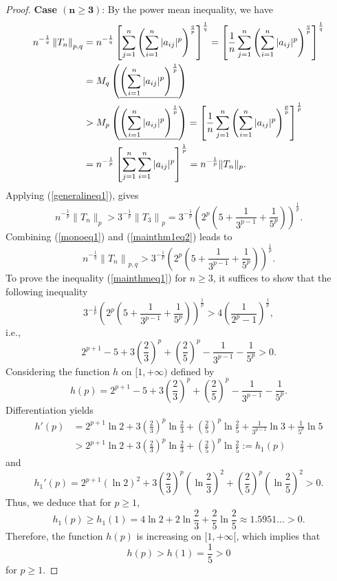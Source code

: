 \documentclass[10pt,a4paper]{amsart}
\begin{document}
\begin{proof} {\bf Case $\boldsymbol{(n\geq3)}$}: By the power mean inequality, we have
\begin{align}\label{monoeq1}
n^{-\frac{1}{q}}\left\|T_{n}\right\|_{p,q}&=n^{-\frac{1}{q}}\left[\sum_{j=1}^n\left(\sum_{i=1}^n|a_{ij}|^p\right)^\frac{q}{p}\right]^\frac{1}{q}=\left[\frac{1}{n}\sum_{j=1}^n\left(\sum_{i=1}^n|a_{ij}|^p\right)^\frac{q}{p}\right]^\frac{1}{q}\notag\\
&=M_q\left(\underline{\left(\sum_{i=1}^n|a_{ij}|^p\right)^\frac{1}{p}}\right)\notag\\
&>M_p\left(\underline{\left(\sum_{i=1}^n|a_{ij}|^p\right)^\frac{1}{p}}\right)=\left[\frac{1}{n}\sum_{j=1}^n\left(\sum_{i=1}^n|a_{ij}|^p\right)^\frac{p}{p}\right]^\frac{1}{p}\notag\\
&=n^{-\frac{1}{p}}\left[\sum_{j=1}^n\sum_{i=1}^n|a_{ij}|^p\right]^\frac{1}{p}=n^{-\frac{1}{p}}\|T_n\|_p.
\end{align}  
Applying  (\ref{generalineq1}), gives
\begin{equation}\label{mainthm1eq2}
n^{-\frac{1}{p}}\|T_n\|_p>3^{-\frac{1}{p}}\left\|T_{3}\right\|_{p}=3^{-\frac{1}{p}}\left(2^{p}\left(5+\frac{1}{3^{p-1}}+\frac{1}{5^{p}}\right)\right)^{\frac{1}{p}}.
\end{equation}
Combining (\ref{monoeq1}) and (\ref{mainthm1eq2}) leads to
$$
n^{-\frac{1}{q}}\left\|T_{n}\right\|_{p,q} >3^{-\frac{1}{p}}\left(2^{p}\left(5+\frac{1}{3^{p-1}}+\frac{1}{5^{p}}\right)\right)^{\frac{1}{p}}.
$$
To prove the inequality (\ref{mainthmeq1}) for $n\geq3$, it suffices to show that the following inequality
$$
3^{-\frac{1}{p}}\left(2^{p}\left(5+\frac{1}{3^{p-1}}+\frac{1}{5^{p}}\right)\right)^{\frac{1}{p}}>4\left(\frac{1}{2^{p}-1}\right)^{\frac{1}{p}},
$$
i.e.,
$$
2^{p+1}-5+3\left(\frac{2}{3}\right)^{p}+\left(\frac{2}{5}\right)^{p}-\frac{1}{3^{p-1}}-\frac{1}{5^p}>0.
$$
Considering the function $h$ on $[1,+\infty)$ defined by 
$$
h(p)=2^{p+1}-5+3\left(\frac{2}{3}\right)^{p}+\left(\frac{2}{5}\right)^{p}-\frac{1}{3^{p-1}}-\frac{1}{5^p}.
$$
Differentiation yields
\begin{align*}
h'(p)&=2^{p+1} \ln 2+3\left(\frac{2}{3}\right)^{p} \ln \frac{2}{3}+\left(\frac{2}{5}\right)^{p} \ln \frac{2}{5}+\frac{1}{3^{p-1}}\ln3+\frac{1}{5^p}\ln 5\\
&>2^{p+1} \ln 2+3\left(\frac{2}{3}\right)^{p} \ln \frac{2}{3}+\left(\frac{2}{5}\right)^{p} \ln \frac{2}{5}:=h_1(p)
\end{align*}
and 
$$
h_1'(p)=  2^{p+1} (\ln 2)^2+3\left(\frac{2}{3}\right)^{p} \left(\ln \frac{2}{3}\right)^2+\left(\frac{2}{5}\right)^{p} \left(\ln \frac{2}{5}\right)^2>0.
$$
Thus, we deduce that for $p\geq1$,
 $$
h_1(p) \geq h_1(1)=4\ln 2+2\ln \frac{2}{3}+\frac{2}{5}\ln \frac{2}{5}\approx1.5951\ldots>0.
$$
Therefore, the function $h(p)$ is increasing on $[1,+\infty[$,  which implies that 
$$h(p)>h(1)=\frac{1}{5}>0$$
for $p\geq1$.


\end{proof}
\end{document}
